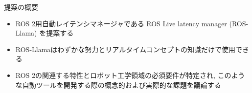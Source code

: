 

\begin{frame}{提案の概要}
    \begin{itemize}
        \item ROS 2用自動レイテンシマネージャである ROS Live latency manager (ROS-Llama) を提案する
        \item ROS-Llamaはわずかな努力とリアルタイムコンセプトの知識だけで使用できる
        \item ROS 2の関連する特性とロボット工学領域の必須要件が特定され, このような自動ツールを開発する際の概念的および実際的な課題を議論する
    \end{itemize}
\end{frame}
